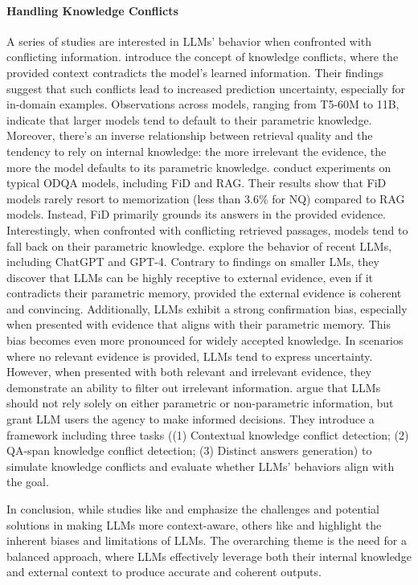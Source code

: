 \paragraph{Handling Knowledge Conflicts}
A series of studies are interested in LLMs' behavior when confronted with conflicting information. \citet{longpre2021entity} introduce the concept of knowledge conflicts, where the provided context contradicts the model's learned information. Their findings suggest that such conflicts lead to increased prediction uncertainty, especially for in-domain examples. Observations across models, ranging from T5-60M to 11B, indicate that larger models tend to default to their parametric knowledge. Moreover, there's an inverse relationship between retrieval quality and the tendency to rely on internal knowledge: the more irrelevant the evidence, the more the model defaults to its parametric knowledge.
\cite{chen2022rich} conduct experiments on typical ODQA models, including FiD and RAG. Their results show that FiD models rarely resort to memorization (less than 3.6\% for NQ) compared to RAG models. Instead, FiD primarily grounds its answers in the provided evidence. Interestingly, when confronted with conflicting retrieved passages, models tend to fall back on their parametric knowledge.
\cite{xie2023adaptive} explore the behavior of recent LLMs, including ChatGPT and GPT-4. Contrary to findings on smaller LMs, they discover that LLMs can be highly receptive to external evidence, even if it contradicts their parametric memory, provided the external evidence is coherent and convincing. Additionally, LLMs exhibit a strong confirmation bias, especially when presented with evidence that aligns with their parametric memory. This bias becomes even more pronounced for widely accepted knowledge. In scenarios where no relevant evidence is provided, LLMs tend to express uncertainty. However, when presented with both relevant and irrelevant evidence, they demonstrate an ability to filter out irrelevant information.
\citet{wang2023resolving} argue that LLMs should not rely solely on either parametric or non-parametric information, but grant LLM users the agency to make informed decisions. They introduce a framework including three tasks ((1) Contextual knowledge conflict detection; (2) QA-span knowledge conflict detection; (3) Distinct answers generation) to simulate knowledge conflicts and evaluate whether LLMs' behaviors align with the goal. 

In conclusion, while studies like \citet{li-etal-2023-large} and \citet{zhou2023context} emphasize the challenges and potential solutions in making LLMs more context-aware, others like \citet{yue2023automatic} and \citet{xie2023adaptive} highlight the inherent biases and limitations of LLMs. The overarching theme is the need for a balanced approach, where LLMs effectively leverage both their internal knowledge and external context to produce accurate and coherent outputs.



